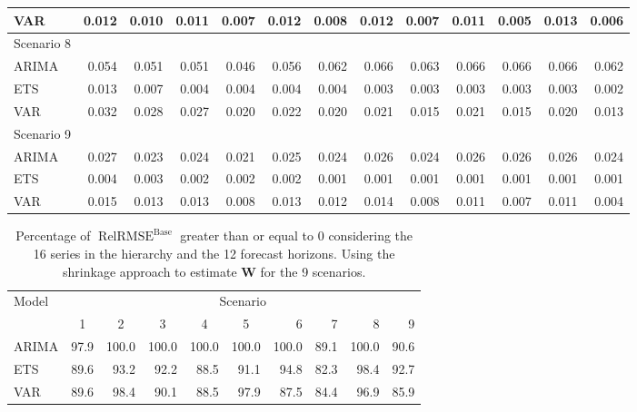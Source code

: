 \documentclass[a4paper,preprint,11pt,authoryear]{elsarticle}
\DeclareMathOperator{\RelRMSE}{RelRMSE}
\DeclareMathOperator{\Base}{Base}
\begin{document}
\begin{table}
{\begin{tabular}{lrrrrrrrrrrrr}
      VAR & 0.012 & 0.010 & 0.011 & 0.007 & 0.012 & 0.008 & 0.012 & 0.007 & 0.011 & 0.005 & 0.013 & 0.006 \\
      \hline
      Scenario 8 & & & & & & & & & & & & \\
      \hline
      ARIMA & 0.054 & 0.051 & 0.051 & 0.046 & 0.056 & 0.062 & 0.066 & 0.063 & 0.066 & 0.066 & 0.066 & 0.062 \\
      ETS & 0.013 & 0.007 & 0.004 & 0.004 & 0.004 & 0.004 & 0.003 & 0.003 & 0.003 & 0.003 & 0.003 & 0.002 \\
      VAR & 0.032 & 0.028 & 0.027 & 0.020 & 0.022 & 0.020 & 0.021 & 0.015 & 0.021 & 0.015 & 0.020 & 0.013 \\
      \hline
      Scenario 9 & & & & & & & & & & & & \\
      \hline
      ARIMA & 0.027 & 0.023 & 0.024 & 0.021 & 0.025 & 0.024 & 0.026 & 0.024 & 0.026 & 0.026 & 0.026 & 0.024 \\
      ETS & 0.004 & 0.003 & 0.002 & 0.002 & 0.002 & 0.001 & 0.001 & 0.001 & 0.001 & 0.001 & 0.001 & 0.001 \\
      VAR & 0.015 & 0.013 & 0.013 & 0.008 & 0.013 & 0.012 & 0.014 & 0.008 & 0.011 & 0.007 & 0.011 & 0.004 \\
      \hline
    \end{tabular}%
  }
  \label{tab:sh_mean}
\end{table}

\begin{table}
  \caption{Percentage of $\RelRMSE^{\Base}$ greater than or equal to 0 considering the 16 series in the hierarchy and the 12 forecast horizons. Using the shrinkage approach to estimate $\bm{W}$ for the 9 scenarios.}
  \centering
  \begin{tabular}{lrrrrrrrrr}
    \hline
    \multirow{2}{*}{Model} & \multicolumn{9}{c}{Scenario} \\ \cline{2-10}
    & \multicolumn{1}{c}{1} & \multicolumn{1}{c}{2} & \multicolumn{1}{c}{3} & \multicolumn{1}{c}{4} & \multicolumn{1}{c}{5} & 6 & 7 & 8 & 9 \\ \hline
    ARIMA & 97.9 & 100.0 & 100.0 & 100.0 & 100.0 & 100.0 & 89.1 & 100.0 & 90.6 \\
    ETS & 89.6 & 93.2 & 92.2 & 88.5 & 91.1 & 94.8 & 82.3 & 98.4 & 92.7 \\
    VAR & 89.6 & 98.4 & 90.1 & 88.5 & 97.9 & 87.5 & 84.4 & 96.9 & 85.9 \\
    \hline
  \end{tabular}%
  \label{tab:porc_sh}
\end{table}
\end{document}

